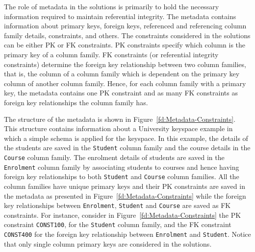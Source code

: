 The role of metadata in  the solutions is primarily to hold the necessary
 information required to maintain referential integrity. The metadata contains
 information about primary keys,   foreign keys,  referenced and referencing
 column family details, constraints, and others.  The constraints considered in
 the solutions can be either \ac{PK} or \ac{FK} constraints. \ac{PK} constraints
 specify which column is the primary key of a column family. \ac{FK} constraints
 (or referential integrity constraints) determine the foreign key relationship
 between two column families, that is, the column of a column family which  is
 dependent on the primary key  column of another column family.  Hence, for each
 column family with a primary key,  the metadata  contains one \ac{PK}
 constraint  and  as many \ac{FK} constraints as foreign key relationships the
 column family has.

The structure of the metadata is shown in Figure~\ref{fd:Metadata-Constraints}.
This structure contains information about a University keyspace example in which
 a simple schema is applied for the keyspace. In this example,  the details of
the students are saved in  the \texttt{Student} column family and the course
 details in the \texttt{Course} column family.  The enrolment details of
 students are saved in the \texttt{Enrolment} column family by associating
 students to courses and hence having foreign key relationships to both
 \texttt{Student} and \texttt{Course} column families. All the column families
 have unique primary keys and their \ac{PK} constraints are saved in the
 metadata as presented in Figure~\ref{fd:Metadata-Constraints} while the foreign
 key relationships between \texttt{Enrolment}, \texttt{Student} and \texttt{Course} are saved as \ac{FK} constraints.  For instance, consider in
 Figure~\ref{fd:Metadata-Constraints} the \ac{PK} constraint \texttt{CONST100},
 for the \texttt{Student} column family, and the \ac{FK} constraint
 \texttt{CONST400} for the foreign key relationship between
\texttt{Enrolment} and \texttt{Student}. Notice that only
 single column primary keys are considered in the solutions.

